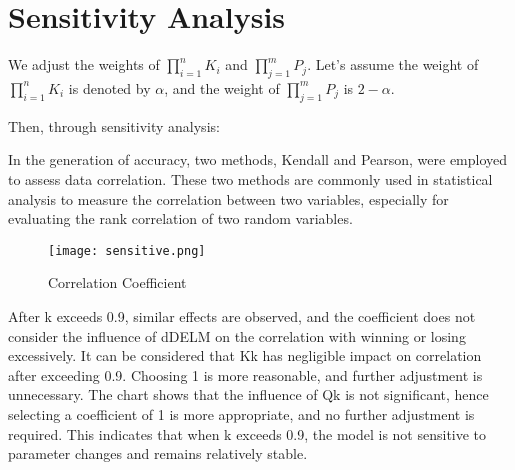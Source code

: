 \documentclass[12pt]{article}
\begin{document}
\section{Sensitivity Analysis}

We adjust the weights of $\prod\limits_{i=1}^n K_i$ and $\prod\limits_{j=1}^m P_j$. Let's assume the weight of $\prod\limits_{i=1}^n K_i$ is denoted by $\alpha$, and the weight of $\prod\limits_{j=1}^m P_j$ is $2 - \alpha$.

Then, through sensitivity analysis:

In the generation of accuracy, two methods, Kendall and Pearson, were employed to assess data correlation. These two methods are commonly used in statistical analysis to measure the correlation between two variables, especially for evaluating the rank correlation of two random variables.





\begin{figure}[H]
	\centering
	\texttt{[image: sensitive.png]}
	\caption{Correlation Coefficient}\label{fig:sensitive}
\end{figure}

After k exceeds 0.9, similar effects are observed, and the coefficient does not consider the influence of dDELM on the correlation with winning or losing excessively. It can be considered that Kk has negligible impact on correlation after exceeding 0.9. Choosing 1 is more reasonable, and further adjustment is unnecessary. The chart shows that the influence of Qk is not significant, hence selecting a coefficient of 1 is more appropriate, and no further adjustment is required. This indicates that when k exceeds 0.9, the model is not sensitive to parameter changes and remains relatively stable.
\end{document}
